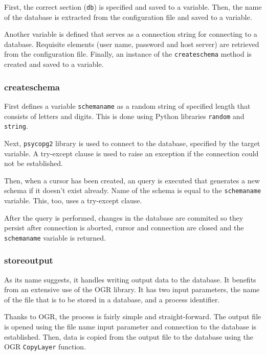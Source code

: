 First, the correct section (\texttt{db}) is specified and saved to a
variable. Then, the name of the database is extracted from the
configuration file and saved to a variable.

Another variable is defined that serves as a connection string for
connecting to a database. Requisite elements (user name, password and
host server) are retrieved from the configuration file. Finally, an
instance of the \texttt{\textunderscore create\textunderscore schema}
method is created and saved to a variable.


\subsubsection{\textunderscore create\textunderscore schema} 

First defines a variable \texttt{schema\textunderscore name} as a
random string of specified length that consists of letters and
digits. This is done using Python libraries \texttt{random} and
\texttt{string}.
 

Next, \texttt{psycopg2} library is used to connect to the database,
specified by the target variable. A try-except clause is used to raise
an exception if the connection could not be established.

Then, when a cursor has been created, an  query is executed
that generates a new schema if it doesn't exist already. Name of the
schema is equal to the \texttt{schema\textunderscore name}
variable. This, too, uses a try-except clause.

After the  query is performed, changes in the database are
commited so they persist after connection is aborted, cursor and
connection are closed and the \texttt{schema\textunderscore name}
variable is returned.

\subsubsection{\textunderscore store\textunderscore output} 
As its name suggests, it handles writing output data to the
database. It benefits from an extensive use of the OGR library. It has
two input parameters, the name of the file that is to be stored in a
database, and a process identifier.

Thanks to OGR, the process is fairly simple and straight-forward. The
output file is opened using the file name input parameter and
connection to the database is established. Then, data is copied from
the output file to the database using the OGR \texttt{CopyLayer}
function.

